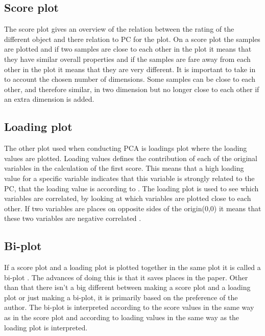 \subsection*{Score plot}
The score plot gives an overview of the relation between the rating of the different object and there relation to PC for the plot. \blankline
%
%
On a score plot the samples are plotted and if two samples are close to each other in the plot it means that they have similar overall properties and if the samples are fare away from each other in the plot it means that they are very different. It is important to take in to account the chosen number of dimensions. Some samples can be close to each other, and therefore similar, in two dimension but no longer close to each other if an extra dimension is added. 
%
\subsection*{Loading plot}
The other plot used when conducting PCA is loadings plot where the loading values are plotted.
Loading values defines the contribution of each of the original variables in the calculation of the first score. This means that a high loading value for a specific variable indicates that this variable is strongly related to the PC, that the loading value is according to \parencite[p. 212]{Naes2010}. \blankline
%
The loading plot is used to see which variables are correlated, by looking at which variables are plotted close to each other. If two variables are places on opposite sides of the origin(0,0) it means that these two variables are negative correlated \parencite[p. 216]{Naes2010}. 
%
\subsection*{Bi-plot}
If a score plot and a loading plot is plotted together in the same plot it is called a bi-plot  \parencite[p. 217]{Naes2010}. The advances of doing this is that it saves places in the paper. Other than that there isn't a big different between making a score plot and a loading plot or just making a bi-plot, it is primarily based on the preference of the author. The bi-plot is interpreted according to the score values in the same way as in the score plot and according to loading values in the same way as the loading plot is interpreted. 
%
